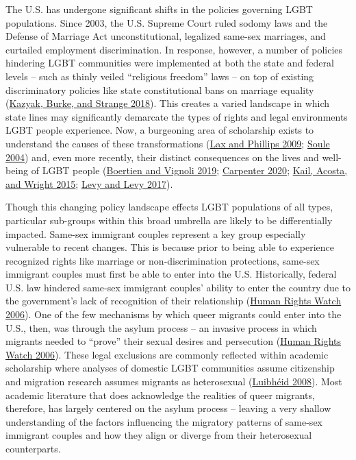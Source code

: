 \documentclass[
  11pt,
]{article}
\begin{document}
The U.S. has undergone significant shifts in the policies governing LGBT populations. Since 2003, the U.S. Supreme Court ruled sodomy laws and the Defense of Marriage Act unconstitutional, legalized same-sex marriages, and curtailed employment discrimination. In response, however, a number of policies hindering LGBT communities were implemented at both the state and federal levels -- such as thinly veiled ``religious freedom'' laws -- on top of existing discriminatory policies like state constitutional bans on marriage equality (\protect\hyperlink{ref-kazyak_2018}{Kazyak, Burke, and Strange 2018}). This creates a varied landscape in which state lines may significantly demarcate the types of rights and legal environments LGBT people experience. Now, a burgeoning area of scholarship exists to understand the causes of these transformations (\protect\hyperlink{ref-lax_2009}{Lax and Phillips 2009}; \protect\hyperlink{ref-soule_2004}{Soule 2004}) and, even more recently, their distinct consequences on the lives and well-being of LGBT people (\protect\hyperlink{ref-boertien_2019}{Boertien and Vignoli 2019}; \protect\hyperlink{ref-carpenter_2020}{Carpenter 2020}; \protect\hyperlink{ref-kail_2015}{Kail, Acosta, and Wright 2015}; \protect\hyperlink{ref-levy_2017}{Levy and Levy 2017}).

Though this changing policy landscape effects LGBT populations of all types, particular sub-groups within this broad umbrella are likely to be differentially impacted. Same-sex immigrant couples represent a key group especially vulnerable to recent changes. This is because prior to being able to experience recognized rights like marriage or non-discrimination protections, same-sex immigrant couples must first be able to enter into the U.S. Historically, federal U.S. law hindered same-sex immigrant couples' ability to enter the country due to the government's lack of recognition of their relationship (\protect\hyperlink{ref-humanrightswatch_2006}{Human Rights Watch 2006}). One of the few mechanisms by which queer migrants could enter into the U.S., then, was through the asylum process -- an invasive process in which migrants needed to ``prove'' their sexual desires and persecution (\protect\hyperlink{ref-humanrightswatch_2006}{Human Rights Watch 2006}). These legal exclusions are commonly reflected within academic scholarship where analyses of domestic LGBT communities assume citizenship and migration research assumes migrants as heterosexual (\protect\hyperlink{ref-luibheid_2008}{Luibhéid 2008}). Most academic literature that does acknowledge the realities of queer migrants, therefore, has largely centered on the asylum process -- leaving a very shallow understanding of the factors influencing the migratory patterns of same-sex immigrant couples and how they align or diverge from their heterosexual counterparts.
\end{document}
